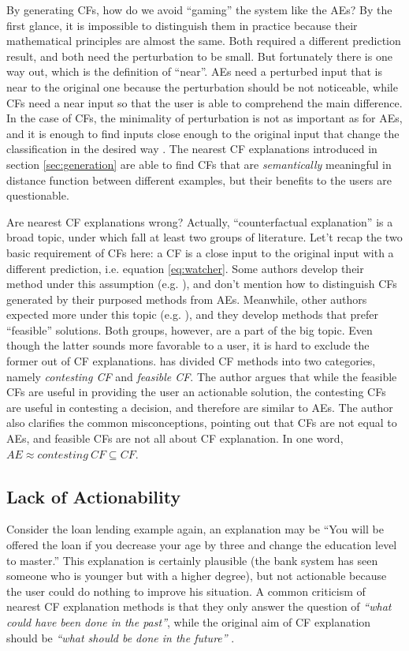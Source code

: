 By generating CFs, how do we avoid  ``gaming'' the system like the AEs? By the first glance, it is impossible to distinguish them in practice because their mathematical principles are almost the same. Both required a different prediction result, and both need the perturbation to be small. But fortunately there is one way out, which is the definition of ``near''. AEs need a perturbed input that is near to the original one because the perturbation should be not noticeable, while CFs need a near input so that the user is able to comprehend the main difference. In the case of CFs, the minimality of perturbation is not as important as for AEs, and it is enough to find inputs close enough to the original input that change the classification in the desired way \cite{CFandAE}. The nearest CF explanations introduced in section \ref{sec:generation} are able to find CFs that are \emph{semantically} meaningful in distance function between different examples, but their benefits to the users are questionable.

Are nearest CF explanations wrong? Actually, ``counterfactual explanation'' is a broad topic, under which fall at least two groups of literature. Let't recap the two basic requirement of CFs here: a CF is a close input to the original input with a different prediction, i.e. equation \ref{eq:watcher}. Some authors develop their method under this assumption (e.g. \cite{certifai,watcher2017,DiCE}), and don't mention how to distinguish CFs generated by their purposed methods from AEs. Meanwhile, other authors expected more under this topic (e.g. \cite{prototype}), and they develop methods that prefer ``feasible'' solutions. Both groups, however, are a part of the big topic. Even though the latter sounds more favorable to a user, it is hard to exclude the former out of CF explanations. \citeauthor{CFandAE} \cite{CFandAE} has divided CF methods into two categories, namely \emph{contesting CF} and \emph{feasible CF}. The author argues that while the feasible CFs are useful in providing the user an actionable solution, the contesting CFs are useful in contesting a decision, and therefore are similar to AEs. The author also clarifies the common misconceptions, pointing out that CFs are not equal to AEs, and feasible CFs are not all about CF explanation. In one word, $AE\approx contesting\ CF\subseteq CF$.
 \subsection{Lack of Actionability}
Consider the loan lending example again, an explanation may be ``You will be offered the loan if you decrease your age by three and change the education level to master.'' This explanation is certainly plausible (the bank system has seen someone who is younger but with a higher degree), but not actionable because the user could do nothing to improve his situation. A common criticism of nearest CF explanation methods is that they only answer the question of \emph{``what could have been done in the past''}, while the original aim of CF explanation should be \emph{``what should be done in the future''} \cite{algorithmicrecourse}.

